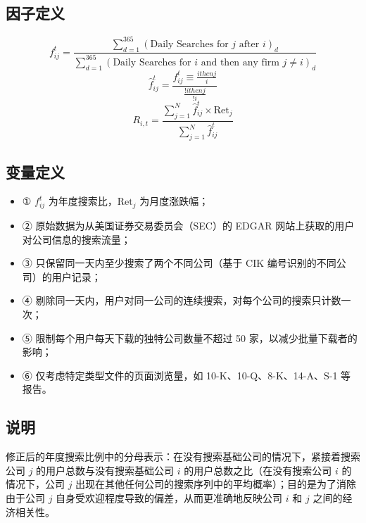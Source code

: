 \documentclass{article}
\begin{document}
\subsection{因子定义}

\begin{equation}
    f_{ij}^t = \frac{\sum_{d=1}^{365} (\text{Daily Searches for } j \text{ after } i)_d}{\sum_{d=1}^{365} (\text{Daily Searches for } i \text{ and then any firm } j \neq i)_d}
\end{equation}
\begin{equation}
    \hat{f}_{ij}^t = \frac{f_{ij}^t \equiv{\frac{ithenj}{i}}}{\frac{!ithenj}{!i}}
\end{equation}
\begin{equation}
    R_{i,t} = \frac{\sum_{j=1}^{N} \hat{f}_{ij}^t \times \mathrm{Ret}_j}{\sum_{j=1}^{N} \hat{f}_{ij}^t}
\end{equation}

\subsection{变量定义}
\begin{itemize}
    \item ① \( f_{ij}^t \) 为年度搜索比，\( \mathrm{Ret}_j \) 为月度涨跌幅；
    \item ② 原始数据为从美国证券交易委员会（SEC）的 EDGAR 网站上获取的用户对公司信息的搜索流量；
    \item ③ 只保留同一天内至少搜索了两个不同公司（基于 CIK 编号识别的不同公司）的用户记录；
    \item ④ 剔除同一天内，用户对同一公司的连续搜索，对每个公司的搜索只计数一次；
    \item ⑤ 限制每个用户每天下载的独特公司数量不超过 50 家，以减少批量下载者的影响；
    \item ⑥ 仅考虑特定类型文件的页面浏览量，如 10-K、10-Q、8-K、14-A、S-1 等报告。
\end{itemize}

\subsection{说明}
修正后的年度搜索比例中的分母表示：在没有搜索基础公司的情况下，紧接着搜索公司 \( j \) 的用户总数与没有搜索基础公司 \( i \) 的用户总数之比（在没有搜索公司 \( i \) 的情况下，公司 \( j \) 出现在其他任何公司的搜索序列中的平均概率）；目的是为了消除由于公司 \( j \) 自身受欢迎程度导致的偏差，从而更准确地反映公司 \( i \) 和 \( j \) 之间的经济相关性。
\end{document}
